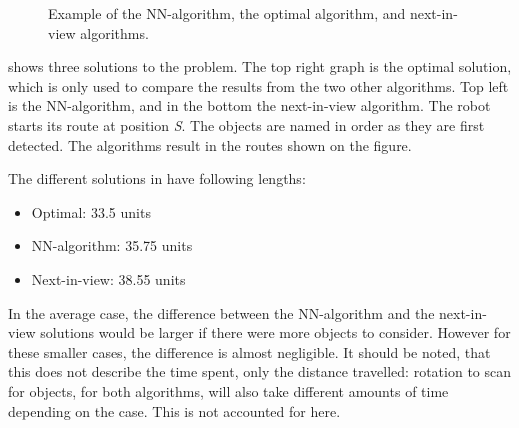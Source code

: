\begin{figure}[H]
     \center{}
     \caption{\label{fig:algorithm-example} Example of the NN-algorithm, the optimal algorithm, and next-in-view algorithms.}
\end{figure}

 shows three solutions to the problem. The top right graph is the optimal solution, which is only used to compare the results from the two other algorithms. Top left is the NN-algorithm, and in the bottom the next-in-view algorithm. The robot starts its route at position \emph{S}. The objects are named in order as they are first detected. The algorithms result in the routes shown on the figure.

The different solutions in  have following lengths:
\begin{itemize}
\item Optimal: 33.5 units
\item NN-algorithm: 35.75 units
\item Next-in-view: 38.55 units
\end{itemize}

In the average case, the difference between the NN-algorithm and the next-in-view solutions would be larger if there were more objects to consider. However for these smaller cases, the difference is almost negligible. It should be noted, that this does not describe the time spent, only the distance travelled: rotation to scan for objects, for both algorithms, will also take different amounts of time depending on the case. This is not accounted for here.

